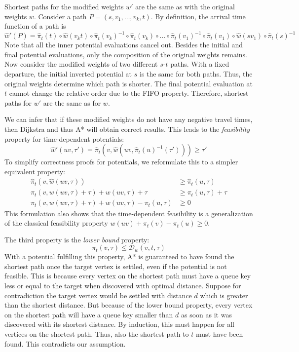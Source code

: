 \documentclass[a4paper,UKenglish,cleveref, autoref, thm-restate]{lipics-v2021}
\newcommand*{\dist}{\mathcal{D}}
\begin{document}
Shortest paths for the modified weights $w'$ are the same as with the original weights $w$.
Consider a path $P = (s,v_1,\dots,v_k,t)$.
By definition, the arrival time function of a path is
\[
\hat{w}'(P) = \hat{\pi}_t(t) \circ \hat{w}(v_k t) \circ \hat{\pi}_t(v_k)^{-1}
\circ \hat{\pi}_t(v_k) \circ \dots \circ \hat{\pi}_t(v_1)^{-1} \circ
\hat{\pi}_t(v_1) \circ \hat{w}(s v_1) \circ \hat{\pi}_t(s)^{-1}
\]
Note that all the inner potential evaluations cancel out.
Besides the initial and final potential evaluations, only the composition of the original weights remains.
Now consider the modified weights of two different $s$-$t$ paths.
With a fixed departure, the initial inverted potential at $s$ is the same for both paths.
Thus, the original weights determine which path is shorter.
The final potential evaluation at $t$ cannot change the relative order due to the FIFO property.
Therefore, shortest paths for $w'$ are the same as for $w$.

We can infer that if these modified weights do not have any negative travel times, then Dijkstra and thus A* will obtain correct results. %
This leads to the \emph{feasibility} property for time-dependent potentials:
\[
\hat{w}'(uv, \tau') = \hat{\pi}_t(v, \hat{w}(uv, \hat{\pi}_t(u)^{-1}(\tau'))) \geq \tau'
\]
To simplify correctness proofs for potentials, we reformulate this to a simpler equivalent property:
\begin{align*}
\hat{\pi}_t(v, \hat{w}(uv, \tau)) & \geq \hat{\pi}_t(u, \tau) \\
\pi_t(v, w(uv, \tau) + \tau) + w(uv, \tau) + \tau & \geq \pi_t(u, \tau) + \tau \\
\pi_t(v, w(uv, \tau) + \tau) + w(uv, \tau) - \pi_t(u, \tau) & \geq 0
\end{align*}
This formulation also shows that the time-dependent feasibility is a generalization of the classical feasibility property $w(uv) + \pi_t(v) - \pi_t(u) \geq 0$.

The third property is the \emph{lower bound} property:
\[
\pi_t(v, \tau) \leq \dist_w(v,t,\tau)
\]
With a potential fulfilling this property, A* is guaranteed to have found the shortest path once the target vertex is settled, even if the potential is not feasible.
This is because every vertex on the shortest path must have a queue key less or equal to the target when discovered with optimal distance.
Suppose for contradiction the target vertex would be settled with distance $d$ which is greater than the shortest distance.
But because of the lower bound property, every vertex on the shortest path will have a queue key smaller than $d$ as soon as it was discovered with its shortest distance.
By induction, this must happen for all vertices on the shortest path.
Thus, also the shortest path to $t$ must have been found.
This contradicts our assumption.
\end{document}
